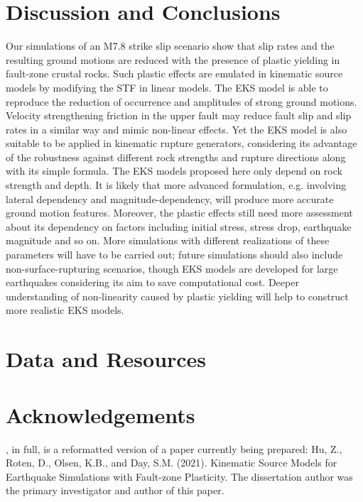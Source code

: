 
\section{Discussion and Conclusions}\label{eks:conclusions}
Our simulations of an M7.8 strike slip scenario show that slip rates and the resulting ground motions are reduced with the presence of plastic yielding in fault-zone crustal rocks. Such plastic effects are emulated in kinematic source models by modifying the STF in linear models. The EKS model is able to reproduce the reduction of occurrence and amplitudes of strong ground motions. Velocity strengthening friction in the upper fault may reduce fault slip and slip rates in a similar way and mimic non-linear effects. Yet the EKS model is also suitable to be applied in kinematic rupture generators, considering its advantage of the robustness against different rock strengths and rupture directions along with its simple formula.
The EKS models proposed here only depend on rock strength and depth. It is likely that more advanced formulation, e.g. involving lateral dependency and magnitude-dependency, will produce more accurate ground motion features. Moreover, the plastic effects still need more assessment about its dependency on factors including initial stress, stress drop, earthquake magnitude and so on. More simulations with different realizations of these parameters will have to be carried out; future simulations should also include non-surface-rupturing scenarios, though EKS models are developed for large earthquakes considering its aim to save computational cost. Deeper understanding of non-linearity caused by plastic yielding will help to construct more realistic EKS models.

\section*{Data and Resources}


\section*{Acknowledgements}

, in full, is a reformatted version of a paper currently being prepared: Hu, Z., Roten, D., Olsen, K.B., and Day, S.M. (2021). Kinematic Source Models for Earthquake Simulations with Fault-zone Plasticity. The dissertation author was the primary investigator and author of this paper.


